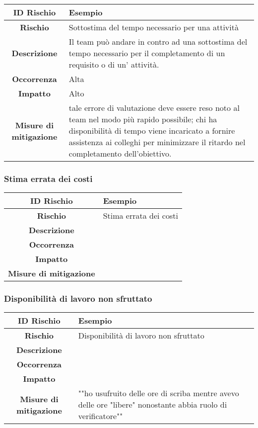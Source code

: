 \documentclass[10pt, a4paper]{article}
\begin{document}
{{{{\renewcommand{\arraystretch}{1.5}
\begin{tabularx}{\textwidth}{c|X}
\textbf{ID Rischio} & Esempio \\
\hline
\textbf{Rischio} & Sottostima del tempo necessario per una attività\\
\hline
\textbf{Descrizione} & Il team può andare in contro ad una sottostima del tempo necessario per il completamento di un requisito o di un' attività.\\
\hline
\textbf{Occorrenza} & Alta\\
\hline
\textbf{Impatto} & Alto\\
\hline
\textbf{Misure di mitigazione} & tale errore di valutazione deve essere reso noto al team nel modo più rapido possibile; chi ha disponibilità di tempo viene incaricato a fornire assistenza ai colleghi per minimizzare il ritardo nel completamento dell'obiettivo.\\

\end{tabularx}}

\subsubsection{Stima errata dei costi}

{\renewcommand{\arraystretch}{1.5}
\begin{tabularx}{\textwidth}{c|X}
\textbf{ID Rischio} & Esempio \\
\hline
\textbf{Rischio} & Stima errata dei costi \\
\hline
\textbf{Descrizione} & \\
\hline
\textbf{Occorrenza} & \\
\hline
\textbf{Impatto} & \\
\hline
\textbf{Misure di mitigazione} & \\
\end{tabularx}


\subsubsection{Disponibilità di lavoro non sfruttato}

{\renewcommand{\arraystretch}{1.5}
\begin{tabularx}{\textwidth}{c|X}
\textbf{ID Rischio} & Esempio \\
\hline
\textbf{Rischio} & Disponibilità di lavoro non sfruttato \\
\hline
\textbf{Descrizione} & \\
\hline
\textbf{Occorrenza} & \\
\hline
\textbf{Impatto} & \\
\hline
\textbf{Misure di mitigazione} &  ""ho usufruito delle ore di scriba mentre avevo delle ore "libere" nonostante abbia ruolo di verificatore"" \\
\end{tabularx}


}}}}}
\end{document}
